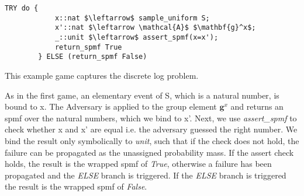 \begin{example}
    \label{assert_spmf_exmpl}
    \hspace{0mm}
    \begin{lstlisting}[language=isabelle]
        TRY do {
            x::nat $\leftarrow$ sample_uniform S;
            x'::nat $\leftarrow \mathcal{A}$ $\mathbf{g}^x$;
            _::unit $\leftarrow$ assert_spmf(x=x');
            return_spmf True
        } ELSE (return_spmf False)
    \end{lstlisting}

    This example game captures the discrete log problem.

    As in the first game, an elementary event of S, which is a natural number, is bound to x. The Adversary is applied to the group element $\mathbf{g}^x$ and returns an spmf over the natural numbers, which we bind to x'.
    Next, we use \textit{assert\_spmf} to check whether x and x' are equal i.e. the adversary guessed the right number. We bind the result only symbolically to \textit{unit}, such that if the check does not hold, the failure can be propagated as the unassigned probability mass. If the assert check holds, the result is the wrapped spmf of \textit{True}, otherwise a failure has been propagated and the \textit{ELSE} branch is triggered. 
    If the \textit{ELSE} branch is triggered the result is the wrapped spmf of \textit{False}.

\end{example}